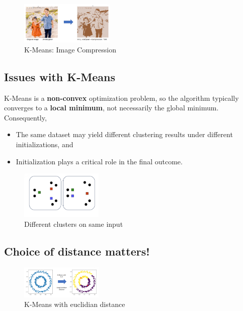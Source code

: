 \documentclass[11pt]{article}
\begin{document}
\begin{figure}[h]
	\centering
	\includegraphics[width=0.4\textwidth]{../imgs/img-cluster-ex.png}
	\caption{K-Means: Image Compression}
\end{figure}

\subsection*{Issues with K-Means}
K-Means is a \textbf{non-convex} optimization problem, so the algorithm typically converges to a \textbf{local minimum}, not necessarily the global minimum. Consequently,
\begin{itemize}
	\item The same dataset may yield different clustering results under different initializations, and
	\item Initialization plays a critical role in the final outcome.
\end{itemize}

\begin{figure}[h]
	\centering
	\includegraphics[width=0.35\textwidth]{../imgs/kissue.png}
	\caption{Different clusters on same input}
\end{figure}

\pagebreak

\subsection*{Choice of distance matters!}

\begin{figure}[h]
	\centering
	\includegraphics[width=0.35\textwidth]{../imgs/kmeans-euc.png}
	\caption{K-Means with euclidian distance}
\end{figure}
\end{document}
